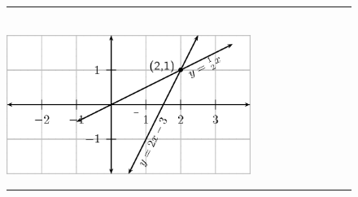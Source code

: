 	\begin{figure}[H] %
    \begin{center}
    \rule[.1in]{\figurerulewidth}{.005in} \\
        \label{m39257*uid96!!!underscore!!!media}\label{m39257*uid96!!!underscore!!!printimage}\includegraphics[width=300px]{col11306.imgs/m39257_MG10C10_006.png} %
        
      \vspace{2pt}
    \vspace{.1in}
    \rule[.1in]{\figurerulewidth}{.005in} \\
        
    \end{center}

 \end{figure}   

    \addtocounter{footnote}{-0}
    
